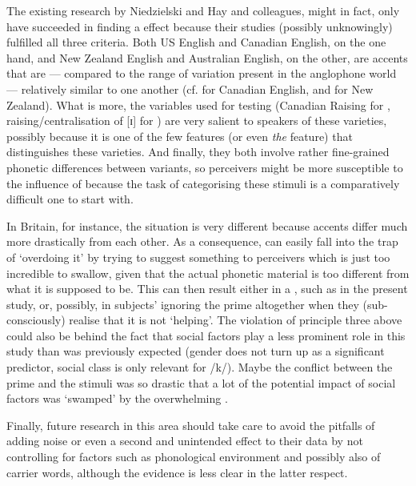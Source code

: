 The existing research by Niedzielski and Hay and colleagues, might in fact, only have succeeded in finding a  effect because their studies (possibly unknowingly) fulfilled all three criteria.
Both US English and Canadian English, on the one hand, and New Zealand English and Australian English, on the other, are accents that are --- compared to the range of variation present in the anglophone world --- relatively similar to one another (cf. \citealt[31]{halford2002} for Canadian English, and \citealt[354]{hayetal2006a} for New Zealand).
What is more, the variables used for testing (Canadian Raising for \citealt{niedzielski1999}, raising/centralisation of [ɪ] for \citealt{hayetal2006a,haydrager2010}) are very salient to speakers of these varieties, possibly because it is one of the few features (or even \emph{the} feature) that distinguishes these varieties.
And finally, they both involve rather fine-grained phonetic differences between variants, so perceivers might be more susceptible to the influence of  because the task of categorising these stimuli is a comparatively difficult one to start with.

In Britain, for instance, the situation is very different because accents differ much more drastically from each other.
As a consequence,  can easily fall into the trap of `overdoing it' by trying to suggest something to perceivers which is just too incredible to swallow, given that the actual phonetic material is too different from what it is supposed to be.
This can then result either in a , such as in the present study, or, possibly, in subjects' ignoring the prime altogether \parencite[like in][]{lawrence2015} when they (sub-consciously) realise that it is not `helping'.
The violation of principle three above could also be behind the fact that social factors play a less prominent role in this study than was previously expected (gender does not turn up as a significant predictor, social class is only relevant for /k/).
Maybe the conflict between the prime and the stimuli was so drastic that a lot of the potential impact of social factors was `swamped' by the overwhelming .

Finally, future research in this area should take care to avoid the pitfalls of adding noise or even a second and unintended  effect to their data by not controlling for factors such as phonological environment and possibly also  of carrier words, although the evidence is less clear in the latter respect.

